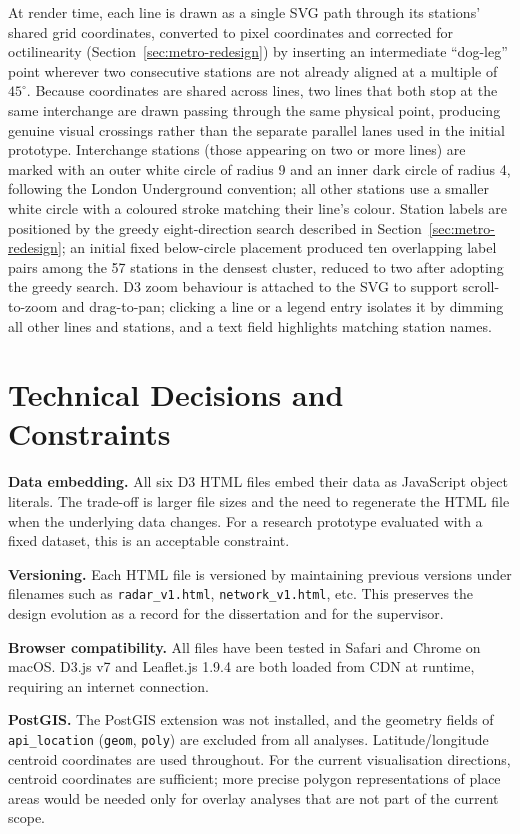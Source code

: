 \documentclass[logo,msc]{infthesis}
\begin{document}
At render time, each line is drawn as a single SVG path through its stations' shared grid coordinates, converted to pixel coordinates and corrected for octilinearity (Section~\ref{sec:metro-redesign}) by inserting an intermediate ``dog-leg'' point wherever two consecutive stations are not already aligned at a multiple of $45^\circ$. Because coordinates are shared across lines, two lines that both stop at the same interchange are drawn passing through the same physical point, producing genuine visual crossings rather than the separate parallel lanes used in the initial prototype. Interchange stations (those appearing on two or more lines) are marked with an outer white circle of radius 9 and an inner dark circle of radius 4, following the London Underground convention; all other stations use a smaller white circle with a coloured stroke matching their line's colour. Station labels are positioned by the greedy eight-direction search described in Section~\ref{sec:metro-redesign}; an initial fixed below-circle placement produced ten overlapping label pairs among the 57 stations in the densest cluster, reduced to two after adopting the greedy search. D3 zoom behaviour is attached to the SVG to support scroll-to-zoom and drag-to-pan; clicking a line or a legend entry isolates it by dimming all other lines and stations, and a text field highlights matching station names.
 
\section{Technical Decisions and Constraints}
\label{sec:technical-decisions}

\textbf{Data embedding.} All six D3 HTML files embed their data as JavaScript object literals. The trade-off is larger file sizes and the need to regenerate the HTML file when the underlying data changes. For a research prototype evaluated with a fixed dataset, this is an acceptable constraint.
 
\textbf{Versioning.} Each HTML file is versioned by maintaining previous versions under filenames such as \texttt{radar\_v1.html}, \texttt{network\_v1.html}, etc. This preserves the design evolution as a record for the dissertation and for the supervisor.
 
\textbf{Browser compatibility.} All files have been tested in Safari and Chrome on macOS. D3.js v7 and Leaflet.js 1.9.4 are both loaded from CDN at runtime, requiring an internet connection.
 
\textbf{PostGIS.} The PostGIS extension was not installed, and the geometry fields of \texttt{api\_location} (\texttt{geom}, \texttt{poly}) are excluded from all analyses. Latitude/longitude centroid coordinates are used throughout. For the current visualisation directions, centroid coordinates are sufficient; more precise polygon representations of place areas would be needed only for overlay analyses that are not part of the current scope.
 
\end{document}
